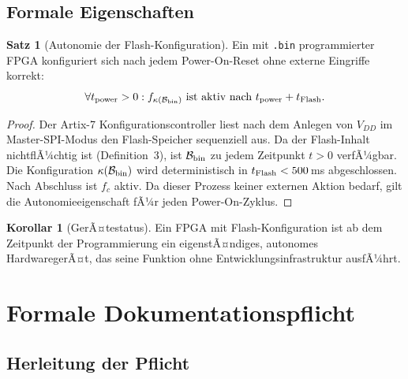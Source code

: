 ﻿\documentclass[a4paper,12pt]{article}
\theoremstyle{definition}
\newtheorem{satz}{Satz}
\newtheorem{korollar}{Korollar}
\begin{document}
\subsection{Formale Eigenschaften}

\begin{satz}[Autonomie der Flash-Konfiguration]
    \label{satz:auto}
    Ein mit \texttt{.bin} programmierter FPGA konfiguriert sich nach jedem
    Power-On-Reset ohne externe Eingriffe korrekt:
    \[
    \forall t_{\rm power} > 0: f_{\kappa(\mathcal{B}_{\rm bin})}
    \text{ ist aktiv nach } t_{\rm power} + t_{\rm Flash}.
    \]
\end{satz}

\begin{proof}
    Der Artix-7 Konfigurationscontroller liest nach dem Anlegen von $V_{DD}$
    im Master-SPI-Modus den Flash-Speicher sequenziell aus. Da der Flash-Inhalt
    nichtflÃ¼chtig ist (Definition~3), ist $\mathcal{B}_{\rm bin}$ zu jedem
    Zeitpunkt $t > 0$ verfÃ¼gbar. Die Konfiguration $\kappa(\mathcal{B}_{\rm bin})$
    wird deterministisch in $t_{\rm Flash} < 500$\,ms abgeschlossen.
    Nach Abschluss ist $f_c$ aktiv. Da dieser Prozess keiner externen
    Aktion bedarf, gilt die Autonomieeigenschaft fÃ¼r jeden Power-On-Zyklus.
    \qedhere
\end{proof}

\begin{korollar}[GerÃ¤testatus]
    Ein FPGA mit Flash-Konfiguration ist ab dem Zeitpunkt der Programmierung
    ein eigenstÃ¤ndiges, autonomes HardwaregerÃ¤t, das seine Funktion ohne
    Entwicklungsinfrastruktur ausfÃ¼hrt.
\end{korollar}

\section{Formale Dokumentationspflicht}
\label{sec:pflicht}

\subsection{Herleitung der Pflicht}
\end{document}
